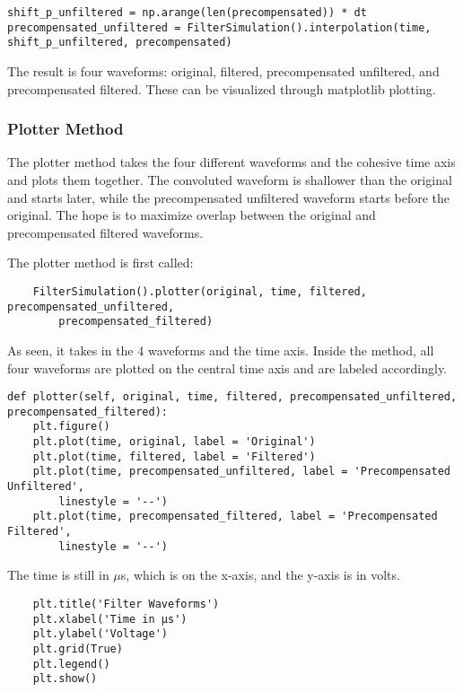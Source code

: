 \documentclass[11pt, a4paper]{article}
\theoremstyle{definition}
\numberwithin{equation}{section}
\begin{document}
\begin{verbatim}
shift_p_unfiltered = np.arange(len(precompensated)) * dt
precompensated_unfiltered = FilterSimulation().interpolation(time, 
shift_p_unfiltered, precompensated)

\end{verbatim}

The result is four waveforms: original, filtered, precompensated unfiltered, and precompensated filtered. These can be visualized through matplotlib plotting.

\subsubsection{Plotter Method}

The plotter method takes the four different waveforms and the cohesive time axis and plots them together. The convoluted waveform is shallower than the original and starts later, while the precompensated unfiltered waveform starts before the original. The hope is to maximize overlap between the original and precompensated filtered waveforms. 

The plotter method is first called:

\begin{verbatim}
    FilterSimulation().plotter(original, time, filtered, precompensated_unfiltered, 
        precompensated_filtered)
\end{verbatim}

As seen, it takes in the 4 waveforms and the time axis. Inside the method, all four waveforms are plotted on the central time axis and are labeled accordingly.

\begin{verbatim}
def plotter(self, original, time, filtered, precompensated_unfiltered, 
precompensated_filtered):
    plt.figure()
    plt.plot(time, original, label = 'Original')
    plt.plot(time, filtered, label = 'Filtered')
    plt.plot(time, precompensated_unfiltered, label = 'Precompensated Unfiltered', 
        linestyle = '--')
    plt.plot(time, precompensated_filtered, label = 'Precompensated Filtered', 
        linestyle = '--')
\end{verbatim}

The time is still in $\mu$s, which is on the x-axis, and the y-axis is in volts.

\begin{verbatim}
    plt.title('Filter Waveforms')
    plt.xlabel('Time in µs')
    plt.ylabel('Voltage')
    plt.grid(True)
    plt.legend()
    plt.show()
\end{verbatim}
\end{document}
